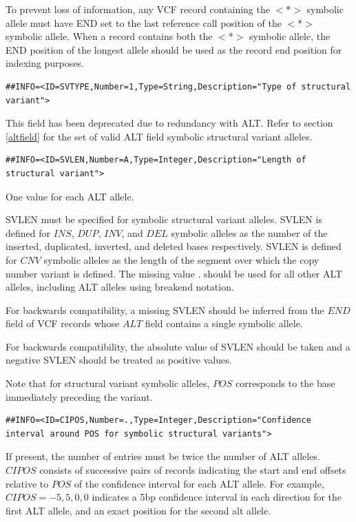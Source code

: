 \documentclass[8pt]{article}
\begin{document}
\begin{samepage}
To prevent loss of information, any VCF record containing the $<$*$>$ symbolic allele must have END set to the last reference call position of the $<$*$>$ symbolic allele.
When a record contains both the $<$*$>$ symbolic allele, the END position of the longest allele should be used as the record end position for indexing purposes.
  
\footnotesize
\begin{verbatim}
##INFO=<ID=SVTYPE,Number=1,Type=String,Description="Type of structural variant">
\end{verbatim}
\normalsize
\end{samepage}

This field has been deprecated due to redundancy with ALT.
Refer to section \ref{altfield} for the set of valid ALT field symbolic structural variant alleles.

\footnotesize
\begin{verbatim}
##INFO=<ID=SVLEN,Number=A,Type=Integer,Description="Length of structural variant">
\end{verbatim}
\normalsize

One value for each ALT allele.

SVLEN must be specified for symbolic structural variant alleles.
SVLEN is defined for $INS$, $DUP$, $INV$, and $DEL$ symbolic alleles as the number of the inserted, duplicated, inverted, and deleted bases respectively.
SVLEN is defined for $CNV$ symbolic alleles as the length of the segment over which the copy number variant is defined.
The missing value $.$ should be used for all other ALT alleles, including ALT alleles using breakend notation.

For backwards compatibility, a missing SVLEN should be inferred from the $END$ field of VCF records whose $ALT$ field contains a single symbolic allele.

For backwards compatibility, the absolute value of SVLEN should be taken and a negative SVLEN should be treated as positive values.

Note that for structural variant symbolic alleles, $POS$ corresponds to the base immediately preceding the variant.

\footnotesize
\begin{verbatim}
##INFO=<ID=CIPOS,Number=.,Type=Integer,Description="Confidence interval around POS for symbolic structural variants">
\end{verbatim}
\normalsize

If present, the number of entries must be twice the number of ALT alleles.
$CIPOS$ consists of successive pairs of records indicating the start and end offsets relative to $POS$ of the confidence interval for each ALT allele.
For example, $CIPOS=-5,5,0,0$ indicates a 5bp confidence interval in each direction for the first ALT allele, and an exact position for the second alt allele.
\end{document}
